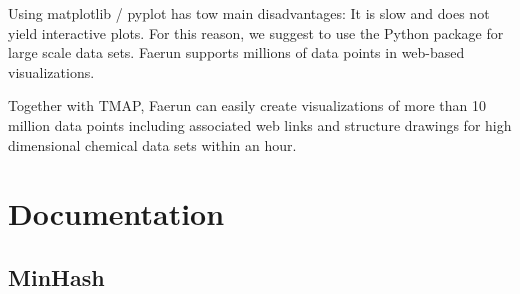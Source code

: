 \documentclass[letterpaper,10pt,english]{sphinxmanual}
\begin{document}
\begin{sphinxVerbatim}[commandchars=\\\{\}]
   

\end{sphinxVerbatim}

\begin{sphinxVerbatim}[commandchars=\\\{\}]
  
    
\end{sphinxVerbatim}

\noindent{}

Using matplotlib / pyplot has tow main disadvantages: It is slow and does
not yield interactive plots. For this reason, we suggest to use
the Python package 
for large scale data sets. Faerun supports millions of data points in web-based
visualizations.

Together with TMAP, Faerun can easily create visualizations of more than
10 million data points including associated web links and structure drawings
for high dimensional chemical data sets within an hour.

\noindent{}

\noindent{}


\section{Documentation}
\label{\detokenize{documentation:documentation}}\label{\detokenize{documentation::doc}}

\subsection{MinHash}
\label{\detokenize{documentation:minhash}}\label{\detokenize{documentation:minhash-doc}}
\end{document}
